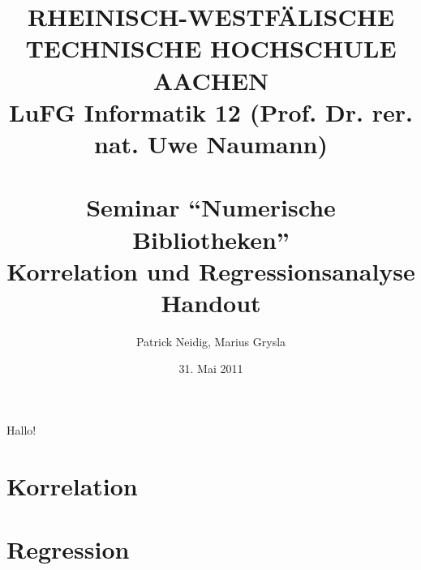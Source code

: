 \documentclass[a4paper]{article}
\title{
{\bf \scriptsize RHEINISCH-WESTF\"ALISCHE TECHNISCHE HOCHSCHULE AACHEN \\
LuFG Informatik 12 (Prof. Dr. rer. nat. Uwe Naumann)}\\
~\\
Seminar ``Numerische Bibliotheken''\\
{\bf \Large Korrelation und Regressionsanalyse} \\
{\large Handout} 
}
\author{Patrick Neidig, Marius Grysla}
\date{31. Mai 2011}
\begin{document}
\maketitle

Hallo!\cite{Cramer2007}

\section{Korrelation}

\section{Regression}


\end{document}
